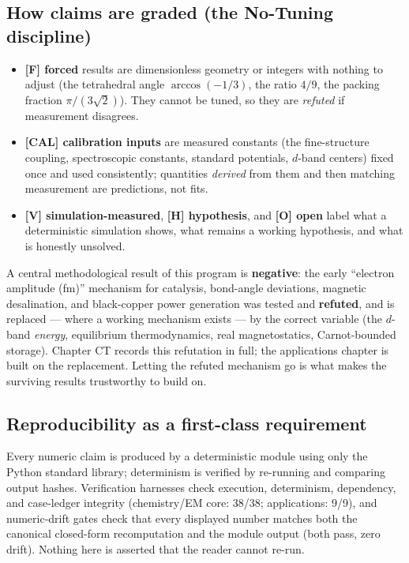 \documentclass[
  10pt,
]{article}
\providecommand{\tightlist}{%
  \setlength{\itemsep}{0pt}\setlength{\parskip}{0pt}}
\begin{document}
\hypertarget{how-claims-are-graded-the-no-tuning-discipline}{%
\subsection{How claims are graded (the No-Tuning
discipline)}\label{how-claims-are-graded-the-no-tuning-discipline}}

\begin{itemize}
\tightlist
\item
  \textbf{{[}F{]} forced} results are dimensionless geometry or integers
  with nothing to adjust (the tetrahedral angle \(\arccos(-1/3)\), the
  ratio \(4/9\), the packing fraction \(\pi/(3\sqrt2)\)). They cannot be
  tuned, so they are \emph{refuted} if measurement disagrees.
\item
  \textbf{{[}CAL{]} calibration inputs} are measured constants (the
  fine-structure coupling, spectroscopic constants, standard potentials,
  \(d\)-band centers) fixed once and used consistently; quantities
  \emph{derived} from them and then matching measurement are
  predictions, not fits.
\item
  \textbf{{[}V{]} simulation-measured}, \textbf{{[}H{]} hypothesis}, and
  \textbf{{[}O{]} open} label what a deterministic simulation shows,
  what remains a working hypothesis, and what is honestly unsolved.
\end{itemize}

A central methodological result of this program is \textbf{negative}:
the early ``electron amplitude (fm)'' mechanism for catalysis,
bond-angle deviations, magnetic desalination, and black-copper power
generation was tested and \textbf{refuted}, and is replaced --- where a
working mechanism exists --- by the correct variable (the \(d\)-band
\emph{energy}, equilibrium thermodynamics, real magnetostatics,
Carnot-bounded storage). Chapter CT records this refutation in full; the
applications chapter is built on the replacement. Letting the refuted
mechanism go is what makes the surviving results trustworthy to build
on.

\hypertarget{reproducibility-as-a-first-class-requirement}{%
\subsection{Reproducibility as a first-class
requirement}\label{reproducibility-as-a-first-class-requirement}}

Every numeric claim is produced by a deterministic module using only the
Python standard library; determinism is verified by re-running and
comparing output hashes. Verification harnesses check execution,
determinism, dependency, and case-ledger integrity (chemistry/EM core:
38/38; applications: 9/9), and numeric-drift gates check that every
displayed number matches both the canonical closed-form recomputation
and the module output (both pass, zero drift). Nothing here is asserted
that the reader cannot re-run.
\end{document}
